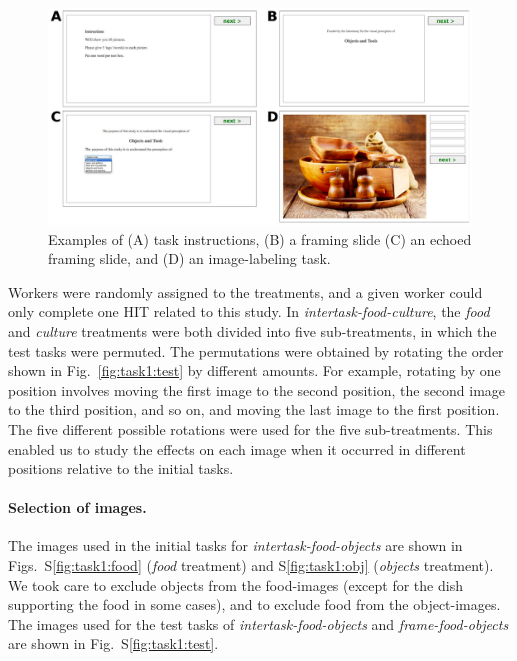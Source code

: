 \documentclass[12pt]{article}
\begin{document}
\begin{figure}
	\includegraphics[scale=0.8]{figs/tasks.pdf}
	\caption{Examples of (A) task instructions, (B) a framing slide
		(C) an echoed framing slide, and (D) an image-labeling 
		task.
	}
	\label{fig:hit_preamble}
\end{figure}
Workers were randomly assigned to the treatments, and 
a given worker could only complete one HIT related to this study.  
In \textit{intertask-food-culture}, the \textit{food} and \textit{culture}
treatments were both divided into five sub-treatments, 
in which the test tasks were permuted.  
The permutations were obtained by rotating 
the order shown in Fig.~\ref{fig:task1:test} by different amounts. 
For example, rotating by one position involves moving the first image to the 
second position, the second image to the third position, and so on, and 
moving the last image to the first position.  
The five different possible rotations were used for the five 
sub-treatments.  This enabled us to study the effects on each image when
it occurred in different positions relative to the initial tasks.

\paragraph{Selection of images.} 

The images used in the initial tasks for \textit{intertask-food-objects}  
are shown in Figs.~S\ref{fig:task1:food} (\textit{food} treatment) and 
S\ref{fig:task1:obj} (\textit{objects} treatment).
We took care to exclude objects from
the food-images (except for the dish supporting the food in some cases), and 
to exclude food from the object-images.  The images used for the test tasks
of \textit{intertask-food-objects} and \textit{frame-food-objects} are shown 
in Fig.~S\ref{fig:task1:test}.
\end{document}
